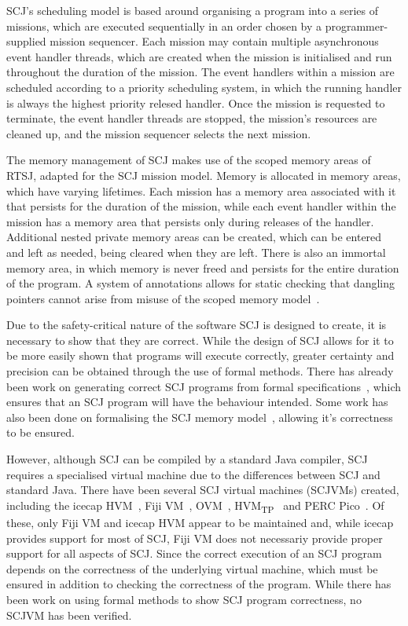 \documentclass[a4paper,10pt]{report}
\begin{document}
SCJ's scheduling model is based around organising a program into a
series of missions, which are executed sequentially in an order chosen
by a programmer-supplied mission sequencer.
Each mission may contain multiple asynchronous event handler threads,
which are created when the mission is initialised and run throughout
the duration of the mission.
The event handlers within a mission are scheduled according to a
priority scheduling system, in which the running handler is always the
highest priority relesed handler.
Once the mission is requested to terminate, the event handler threads
are stopped, the mission's resources are cleaned up, and the mission
sequencer selects the next mission.

The memory management of SCJ makes use of the scoped memory areas of
RTSJ, adapted for the SCJ mission model.
Memory is allocated in memory areas, which have varying lifetimes.
Each mission has a memory area associated with it that persists for
the duration of the mission, while each event handler within the
mission has a memory area that persists only during releases of the
handler.
Additional nested private memory areas can be created, which can be
entered and left as needed, being cleared when they are left.
There is also an immortal memory area, in which memory is never freed
and persists for the entire duration of the program.
A system of annotations allows for static checking that dangling
pointers cannot arise from misuse of the scoped memory
model~\cite{tang2010}.

Due to the safety-critical nature of the software SCJ is designed to
create, it is necessary to show that they are correct.
While the design of SCJ allows for it to be more easily shown that
programs will execute correctly, greater certainty and precision can
be obtained through the use of formal methods.
There has already been work on generating correct SCJ programs from
formal specifications~\cite{cavalcanti2011, cavalcanti2013}, which
ensures that an SCJ program will have the behaviour intended.
Some work has also been done on formalising the SCJ memory
model~\cite{cavalcanti2011a}, allowing it's correctness to be ensured.

However, although SCJ can be compiled by a standard Java compiler, SCJ
requires a specialised virtual machine due to the differences between
SCJ and standard Java.
There have been several SCJ virtual machines (SCJVMs) created,
including the icecap HVM~\cite{sondergaard2012}, Fiji
VM~\cite{pizlo2009}, OVM~\cite{armbruster2007},
HVM\textsubscript{TP}~\cite{luckow2014} and PERC Pico~\cite{atego2015,
  richard2010}.
Of these, only Fiji VM and icecap HVM appear to be maintained and,
while icecap provides support for most of SCJ, Fiji VM does not
necessariy provide proper support for all aspects of SCJ.
Since the correct execution of an SCJ program depends on the
correctness of the underlying virtual machine, which must be ensured
in addition to checking the correctness of the program.
While there has been work on using formal methods to show SCJ program
correctness, no SCJVM has been verified.
\end{document}
